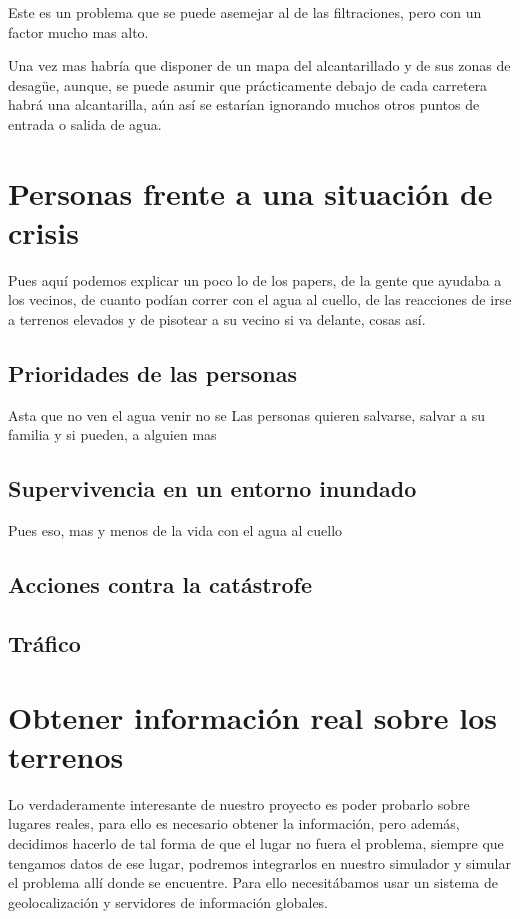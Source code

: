 Este es un problema que se puede asemejar al de las filtraciones, pero con un
factor mucho mas alto.

Una vez mas habría que disponer de un mapa del alcantarillado y de sus zonas de
desagüe, aunque, se puede asumir que prácticamente debajo de cada carretera
habrá una alcantarilla, aún así se estarían ignorando muchos otros puntos de
entrada o salida de agua.

\section*{Personas frente a una situación de crisis}
Pues aquí podemos explicar un poco lo de los papers, de la gente que ayudaba a
los vecinos, de cuanto podían correr con el agua al cuello, de las reacciones de
irse a terrenos elevados y de pisotear a su vecino si va delante, cosas así.

\subsection*{Prioridades de las personas}
Asta que no ven el agua venir no se Las personas quieren salvarse, salvar a su
familia y si pueden, a alguien mas

\subsection*{Supervivencia en un entorno inundado}
Pues eso, mas y menos de la vida con el agua al cuello

\subsection*{Acciones contra la catástrofe}

\subsection*{Tráfico}

\section*{Obtener información real sobre los terrenos}

Lo verdaderamente interesante de nuestro proyecto es poder probarlo sobre
lugares reales, para ello es necesario obtener la información, pero además,
decidimos hacerlo de tal forma de que el lugar no fuera el problema, siempre que
tengamos datos de ese lugar, podremos integrarlos en nuestro simulador y simular
el problema allí donde se encuentre. Para ello necesitábamos usar un sistema de
geolocalización y servidores de información globales.

